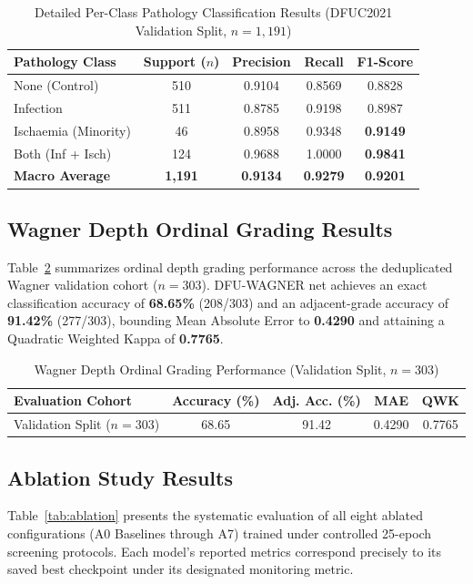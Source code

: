 \documentclass[journal]{IEEEtran}
\begin{document}
\begin{table}[h]
\centering
\caption{Detailed Per-Class Pathology Classification Results (DFUC2021 Validation Split, $n=1,191$)}
\label{tab:per_class}
\begin{tabular}{lcccc}
\toprule
\textbf{Pathology Class} & \textbf{Support ($n$)} & \textbf{Precision} & \textbf{Recall} & \textbf{F1-Score} \\
\midrule
None (Control) & 510 & 0.9104 & 0.8569 & 0.8828 \\
Infection & 511 & 0.8785 & 0.9198 & 0.8987 \\
Ischaemia (Minority) & 46 & 0.8958 & 0.9348 & \textbf{0.9149} \\
Both (Inf + Isch) & 124 & 0.9688 & 1.0000 & \textbf{0.9841} \\
\midrule
\textbf{Macro Average} & \textbf{1,191} & \textbf{0.9134} & \textbf{0.9279} & \textbf{0.9201} \\
\bottomrule
\end{tabular}
\end{table}

\subsection{Wagner Depth Ordinal Grading Results}
Table~\ref{tab:wagner_results} summarizes ordinal depth grading performance across the deduplicated Wagner validation cohort ($n = 303$). DFU-WAGNER net achieves an exact classification accuracy of \textbf{68.65\%} (208/303) and an adjacent-grade accuracy of \textbf{91.42\%} (277/303), bounding Mean Absolute Error to \textbf{0.4290} and attaining a Quadratic Weighted Kappa of \textbf{0.7765}.

\begin{table}[h]
\centering
\caption{Wagner Depth Ordinal Grading Performance (Validation Split, $n=303$)}
\label{tab:wagner_results}
\begin{tabular}{lcccc}
\toprule
\textbf{Evaluation Cohort} & \textbf{Accuracy (\%)} & \textbf{Adj. Acc. (\%)} & \textbf{MAE} & \textbf{QWK} \\
\midrule
Validation Split ($n=303$) & 68.65 & 91.42 & 0.4290 & 0.7765 \\
\bottomrule
\end{tabular}
\end{table}

\subsection{Ablation Study Results}
Table~\ref{tab:ablation} presents the systematic evaluation of all eight ablated configurations (A0 Baselines through A7) trained under controlled 25-epoch screening protocols. Each model's reported metrics correspond precisely to its saved best checkpoint under its designated monitoring metric.
\end{document}
